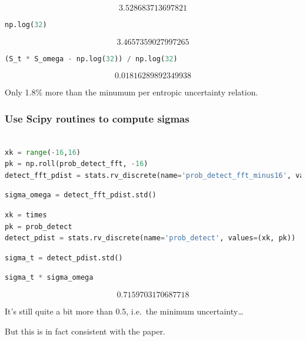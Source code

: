 \[3.528683713697821\]

\begin{lstlisting}[language=Python]
np.log(32)
\end{lstlisting}

\[3.4657359027997265\]

\begin{lstlisting}[language=Python]
(S_t * S_omega - np.log(32)) / np.log(32)
\end{lstlisting}

\[0.01816289892349938\]

Only 1.8\% more than the minumum per entropic uncertainty relation.

\hypertarget{use-scipy-routines-to-compute-sigmas}{%
\subsubsection{Use Scipy routines to compute
sigmas}\label{use-scipy-routines-to-compute-sigmas}}

\begin{lstlisting}[language=Python]

xk = range(-16,16)
pk = np.roll(prob_detect_fft, -16)
detect_fft_pdist = stats.rv_discrete(name='prob_detect_fft_minus16', values=(xk, pk))
\end{lstlisting}

\begin{lstlisting}[language=Python]
sigma_omega = detect_fft_pdist.std()
\end{lstlisting}

\begin{lstlisting}[language=Python]
xk = times
pk = prob_detect
detect_pdist = stats.rv_discrete(name='prob_detect', values=(xk, pk))
\end{lstlisting}

\begin{lstlisting}[language=Python]
sigma_t = detect_pdist.std()
\end{lstlisting}

\begin{lstlisting}[language=Python]
sigma_t * sigma_omega
\end{lstlisting}

\[0.7159703170687718\]

It's still quite a bit more than 0.5, i.e.~the minimum
uncertainty\ldots{}

But this is in fact consistent with the paper.
